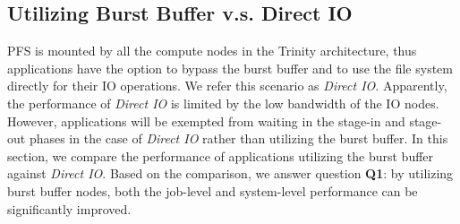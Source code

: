%
%
%
\subsection{Utilizing Burst Buffer v.s. Direct IO}
\label{Sec:Sim:DirectIOvsBB}



PFS is mounted by all the compute nodes in the Trinity architecture, thus applications have the
option to bypass the burst buffer and to use the file system directly for their IO operations.
We refer this scenario as \textit{Direct IO}. Apparently, the performance of \textit{Direct IO}
is limited by the low bandwidth of the IO nodes. However, applications will be exempted from
waiting in the stage-in and stage-out phases in the case of \textit{Direct IO} rather than utilizing the burst buffer.
In this section, we compare the performance of applications utilizing the burst buffer
against \textit{Direct IO}.
Based on the comparison, we answer question \textbf{Q1}: by utilizing burst buffer nodes,
both the job-level and system-level performance can be significantly improved.


